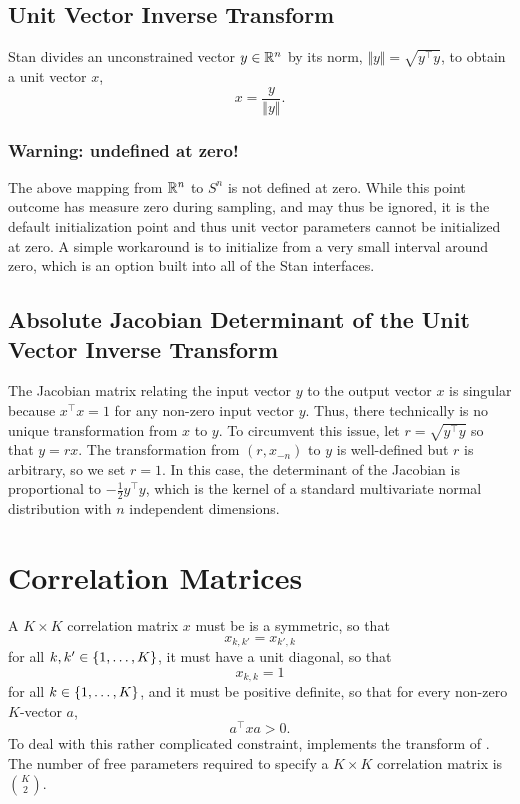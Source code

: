 \subsection{Unit Vector Inverse Transform}

Stan divides an unconstrained vector $y \in \reals^{n}$ by its norm,
$\Vert y \Vert = \sqrt{y^\top y}$, to obtain a unit vector $x$,
%
\[
x = \frac{y}{\Vert y \Vert}.
\]
%

\subsubsection{Warning: undefined at zero!}

The above mapping from $\reals^n$ to $S^n$ is not defined at zero.
While this point outcome has measure zero during sampling, and may
thus be ignored, it is the default initialization point and thus unit
vector parameters cannot be initialized at zero.  A simple workaround
is to initialize from a very small interval around zero, which is an
option built into all of the Stan interfaces.

\subsection{Absolute Jacobian Determinant of the Unit Vector Inverse
  Transform}

The Jacobian matrix relating the input vector $y$ to the output vector
$x$ is singular because $x^\top x = 1$ for any non-zero input vector
$y$. Thus, there technically is no unique transformation from $x$ to
$y$. To circumvent this issue, let $r = \sqrt{y^\top y}$ so that $y = r
x$. The transformation from $\left(r, x_{-n}\right)$ to $y$ is
well-defined but $r$ is arbitrary, so we set $r = 1$. In this case,
the determinant of the Jacobian is proportional to $-\frac{1}{2} y^\top y$,
which is the kernel of a standard multivariate normal distribution
with $n$ independent dimensions.

\section{Correlation Matrices}\label{correlation-matrix-transform.section}

A $K \times K$ correlation matrix $x$ must be is a symmetric, so that
%
\[
x_{k,k'} = x_{k',k}
\]
for all $k,k' \in \setlist{1,\ldots,K}$, it must have a unit diagonal,
so that
\[
x_{k,k} = 1
\]
for all $k \in \setlist{1,\ldots,K}$, and it must be positive
definite, so that for every non-zero $K$-vector $a$,
\[
a^{\top} x a > 0.
\]
To deal with this rather complicated constraint, \Stan implements the
transform of \cite{LewandowskiKurowickaJoe:2009}.  The number of free
parameters required to specify a $K \times K$ correlation matrix is $\binom{K}{2}$.

